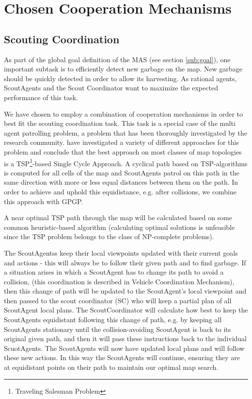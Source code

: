 \section{Chosen Cooperation Mechanisms}
\label{sec:chosCoop}


\subsection{Scouting Coordination}

As part of the global goal definition of the MAS (see section \ref{sub:goal}), one important subtask is to efficiently detect new garbage on the map. New garbage should be quickly detected in order to allow its harvesting. As rational agents, ScoutAgents and the Scout Coordinator want to maximize the expected performance of this task.

We have chosen to employ a combination of cooperation mechanisms in order to best fit the scouting coordination task. This task is a special case of the multi agent patrolling problem, a problem that has been thoroughly investigated by the research community. \cite{Almeida2004} have investigated a variety of different approaches for this problem and conclude that the best approach on most classes of map topologies is a TSP\footnote{Traveling Salesman Problem}-based Single Cycle Approach. A cyclical path based on TSP-algorithms is computed for all cells of the map and ScoutAgents patrol on this path in the same direction with more or less equal distances between them on the path. In order to achieve and uphold this equidistance, e.g. after collisions, we combine this approach with GPGP.

A near optimal TSP path through the map will be calculated based on some common heuristic-based algorithm (calculating optimal solutions is unfeasible since the TSP problem belongs to the class of NP-complete problems).  


The ScoutAgentss keep their local viewpoints updated with their current goals and actions - this will always be to follow their given path and to find garbage. If a situation arises in which a ScoutAgent has to change its path to avoid a collision, (this coordination is described in Vehicle Coordination Mechanism), then this change of path will be updated to the ScoutAgent’s local viewpoint and then passed to the scout coordinator (SC) who will keep a partial plan of all ScoutAgent local plans. The ScoutCoordinator will calculate how best to keep the ScoutAgents equidistant following this change of path, e.g. by keeping all ScoutAgents stationary until the collision-avoiding ScoutAgent is back to its original given path, and then it will pass these instructions back to the individual ScuotAgents. The ScoutAgents will now have updated local plans and will follow these new actions. In this way the ScoutAgents will continue, ensuring they are at equidistant points on their path to maintain our optimal map search. 
  


